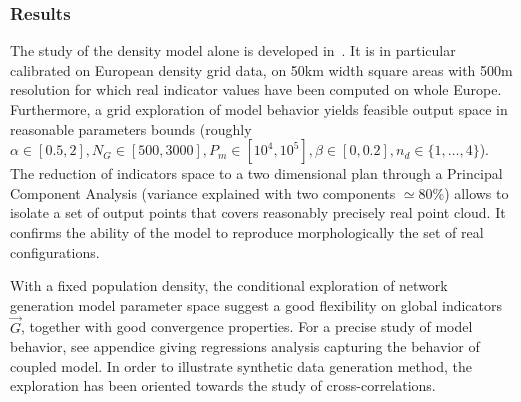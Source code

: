 \documentclass{article}
\begin{document}
\subsubsection*{Results}

The study of the density model alone is developed in~\cite{raimbault2018calibration}. It is in particular calibrated on European density grid data, on 50km width square areas with 500m resolution for which real indicator values have been computed on whole Europe. Furthermore, a grid exploration of model behavior yields feasible output space in reasonable parameters bounds (roughly $\alpha \in [0.5,2],N_G\in [500,3000], P_m \in [10^4,10^5],\beta\in [0,0.2], n_d \in \{ 1, \ldots , 4\}$). The reduction of indicators space to a two dimensional plan through a Principal Component Analysis (variance explained with two components $\simeq 80\%$) allows to isolate a set of output points that covers reasonably precisely real point cloud. It confirms the ability of the model to reproduce morphologically the set of real configurations.



With a fixed population density, the conditional exploration of network generation model parameter space suggest a good flexibility on global indicators $\vec{G}$, together with good convergence properties. For a precise study of model behavior, see appendice giving regressions analysis capturing the behavior of coupled model. In order to illustrate synthetic data generation method, the exploration has been oriented towards the study of cross-correlations.
\end{document}
